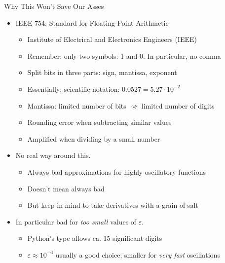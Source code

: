 \begin{frame}{Why This Won't Save Our Asses}
%
\begin{itemize}
\item IEEE 754: Standard for Floating-Point Arithmetic
	\begin{itemize}
	\item Institute of Electrical and Electronics Engineers (IEEE)
	\item Remember: only two symbols: 1 and 0. In particular, no comma
	\item Split bits in three parts: sign, mantissa, exponent
	\item Essentially: scientific notation: $0.0527 = 5.27 \cdot 10^{-2}$
	\item Mantissa: limited number of bits $\rightsquigarrow$ limited number of digits
	\item Rounding error when subtracting similar values
	\item Amplified when dividing by a small number
	\end{itemize}
\item No real way around this.
	\begin{itemize}
	\item Always bad approximations for highly oscillatory functions
	\item Doesn't mean always bad
	\item But keep in mind to take derivatives with a grain of salt
	\end{itemize}
\item In particular bad for \emph{too small} values of $\varepsilon$.
	\begin{itemize}
	\item Python's  type allows ca. 15 significant digits
	\item $\varepsilon \approx 10^{-6}$ usually a good choice; smaller for \emph{very fast} oscillations
	\end{itemize}
\end{itemize}
%
\end{frame}



